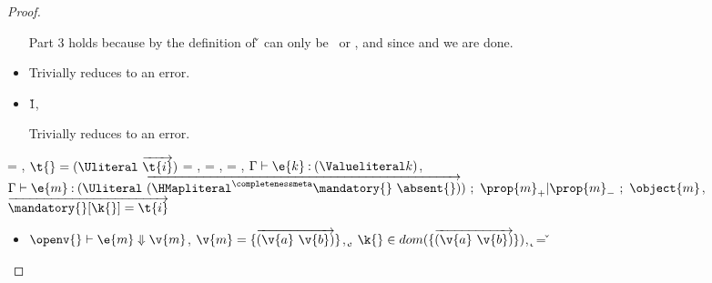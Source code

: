 \begin{lemma}
\begin{proof}
\begin{case}[T-IsA]
\begin{itemize}
\begin{subcase}[B-IsA]
        Part 3 holds because by the definition of \isaopsemliteral
        \v{} can only be \true\ or \false, 
        and since \judgementtwo{\propenv{}}{\hastype{\true}{\t{}}}
        and
        \judgementtwo{\propenv{}}{\hastype{\false}{\t{}}}
        we are done.
      \end{subcase}
    \item[]
      \begin{subcase}[BE-IsA1]
        \opsem {\openv{}} {} {\errorvalv{}}

        Trivially reduces to an error.
      \end{subcase}
    \item[]
      \begin{subcase}[BE-IsA2]
       \opsem {\openv{}} {} {\v{1}},
       \opsem {\openv{}} {} {\errorvalv{}}

        Trivially reduces to an error.
      \end{subcase}
  \end{itemize}
\end{case}

\begin{case}[T-GetHMap]
  \e{} = { {}},
  $\t{} = {\Unionsplice {\overrightarrow {\t{i}}}}$
  \thenprop{\prop{}} = {\topprop{}},
  \elseprop{\prop{}} = {\topprop{}},
  \object{} = {
                          {}
                          {\x{}}},
  $\judgementtwo {\propenv{}} {\hastype {\e{k}} {\Value {k}}}$,
  $\judgement {\propenv{}} {\hastype {\e{m}} {\Unionsplice {\overrightarrow {\HMapgeneric {\mandatory{}} {\absent{}}}}}}
           {\filterset {\thenprop {\prop{m}}} {\elseprop {\prop{m}}}}
           {\object{m}}$,
  $\overrightarrow{\inmandatory{\k{}}{\t{i}}{\mandatory{}}}$


  \begin{itemize}
    \item[]
      \begin{subcase}[B-Get]
      $\opsem {\openv{}} {\e{m}}{\v{m}}$,
        $\v{m} = {\curlymap{\overrightarrow{({\v{a}}\ {\v{b}})}}}$,
         \opsem {\openv{}} {} {\k{}},
         $\keyinmap{\k{}}{\curlymap{\overrightarrow{({\v{a}}\ {\v{b}})}}}$,
          {\k{}} = {\v{}}


\end{subcase}
\end{itemize}
\end{case}
\end{proof}
\end{lemma}
